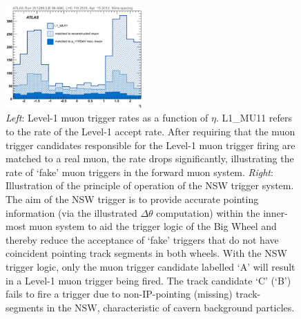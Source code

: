 \begin{figure}[!htb]
    \begin{center}
        \includegraphics[width=0.47\textwidth]{figures/nsw/nsw_l1mu_rates}
        \caption{
            \textit{Left}: Level-1 muon trigger rates as a function of $\eta$. L1\_MU11 refers to the
                rate of the Level-1 accept rate. After requiring that the muon trigger candidates
                responsible for the Level-1 muon trigger firing are matched to a real muon, the
                rate drops significantly, illustrating the rate of `fake' muon triggers in the
                forward muon system.
            \textit{Right}: Illustration of the principle of operation of the NSW trigger system.
                The aim of the NSW trigger is to provide accurate pointing information (via the illustrated $\Delta \theta$ computation) within
                the inner-most muon system to aid the trigger logic of the Big Wheel and thereby reduce the acceptance of `fake' triggers that
                do not have coincident pointing track segments in both wheels.
                With the NSW trigger logic, only the muon trigger candidate labelled `A' will result
                in a Level-1 muon trigger being fired.
                The track candidate `C' (`B') fails to fire a trigger due to non-IP-pointing (missing) track-segments in the NSW,
                characteristic of cavern background particles.
        }
        \label{fig:l1mu_rates}
    \end{center}
\end{figure}

